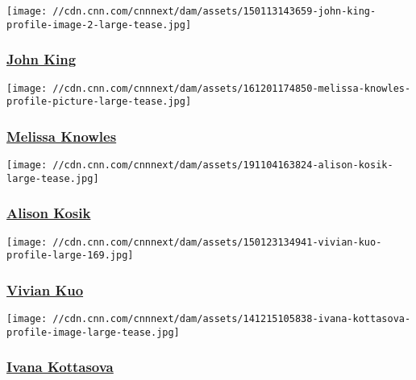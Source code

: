 \href{/profiles/john-king-profile}{}

\texttt{[image: //cdn.cnn.com/cnnnext/dam/assets/150113143659-john-king-profile-image-2-large-tease.jpg]}

\hypertarget{john-king-}{%
\subsubsection{\texorpdfstring{\href{/profiles/john-king-profile}{John
King }}{John King }}\label{john-king-}}

\href{/profiles/melissa-knowles}{}

\texttt{[image: //cdn.cnn.com/cnnnext/dam/assets/161201174850-melissa-knowles-profile-picture-large-tease.jpg]}

\hypertarget{melissa-knowles}{%
\subsubsection{\texorpdfstring{\href{/profiles/melissa-knowles}{Melissa
Knowles}}{Melissa Knowles}}\label{melissa-knowles}}

\href{/profiles/alison-kosik-profile}{}

\texttt{[image: //cdn.cnn.com/cnnnext/dam/assets/191104163824-alison-kosik-large-tease.jpg]}

\hypertarget{alison-kosik}{%
\subsubsection{\texorpdfstring{\href{/profiles/alison-kosik-profile}{Alison
Kosik}}{Alison Kosik}}\label{alison-kosik}}

\href{/profiles/vivian-kuo}{}

\texttt{[image: //cdn.cnn.com/cnnnext/dam/assets/150123134941-vivian-kuo-profile-large-169.jpg]}

\hypertarget{vivian-kuo}{%
\subsubsection{\texorpdfstring{\href{/profiles/vivian-kuo}{Vivian
Kuo}}{Vivian Kuo}}\label{vivian-kuo}}

\href{/profiles/ivana-kottasova}{}

\texttt{[image: //cdn.cnn.com/cnnnext/dam/assets/141215105838-ivana-kottasova-profile-image-large-tease.jpg]}

\hypertarget{ivana-kottasova}{%
\subsubsection{\texorpdfstring{\href{/profiles/ivana-kottasova}{Ivana
Kottasova}}{Ivana Kottasova}}\label{ivana-kottasova}}

